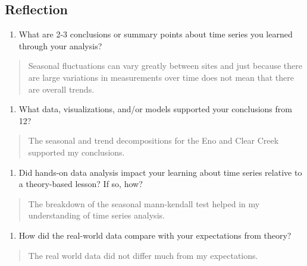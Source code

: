 \documentclass[]{article}
\providecommand{\tightlist}{%
  \setlength{\itemsep}{0pt}\setlength{\parskip}{0pt}}
\begin{document}
\hypertarget{reflection}{%
\subsection{Reflection}\label{reflection}}

\begin{enumerate}
\def\labelenumi{\arabic{enumi}.}
\setcounter{enumi}{14}
\tightlist
\item
  What are 2-3 conclusions or summary points about time series you
  learned through your analysis?
\end{enumerate}

\begin{quote}
Seasonal fluctuations can vary greatly between sites and just because
there are large variations in measurements over time does not mean that
there are overall trends.
\end{quote}

\begin{enumerate}
\def\labelenumi{\arabic{enumi}.}
\setcounter{enumi}{15}
\tightlist
\item
  What data, visualizations, and/or models supported your conclusions
  from 12?
\end{enumerate}

\begin{quote}
The seasonal and trend decompositions for the Eno and Clear Creek
supported my conclusions.
\end{quote}

\begin{enumerate}
\def\labelenumi{\arabic{enumi}.}
\setcounter{enumi}{16}
\tightlist
\item
  Did hands-on data analysis impact your learning about time series
  relative to a theory-based lesson? If so, how?
\end{enumerate}

\begin{quote}
The breakdown of the seasonal mann-kendall test helped in my
understanding of time series analysis.
\end{quote}

\begin{enumerate}
\def\labelenumi{\arabic{enumi}.}
\setcounter{enumi}{17}
\tightlist
\item
  How did the real-world data compare with your expectations from
  theory?
\end{enumerate}

\begin{quote}
The real world data did not differ much from my expectations.
\end{quote}
\end{document}
